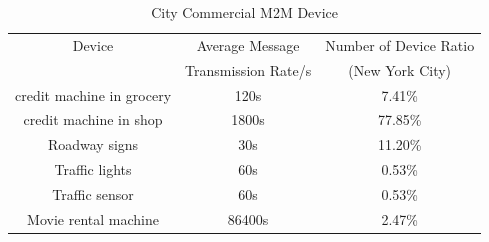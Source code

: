 \documentclass[a4j]{ujarticle}
\begin{document}
\begin{table}[h]
 \caption{City Commercial M2M Device}
 \label{table:CityCommercialM2MDevice}
 \centering
  \begin{tabular}{ccc}
   \hline
   Device & Average Message & Number of Device Ratio\\
   & Transmission Rate/s & (New York City) \\
   \hline \hline
    credit machine in grocery & 120s & 7.41\%  \\
    credit machine in shop & 1800s & 77.85\% \\
    Roadway signs & 30s & 11.20\%  \\
    Traffic lights & 60s & 0.53\%  \\
    Traffic sensor & 60s & 0.53\%  \\
    Movie rental machine & 86400s & 2.47\%  \\
   \hline
  \end{tabular}
\end{table}

%
%
\end{document}
